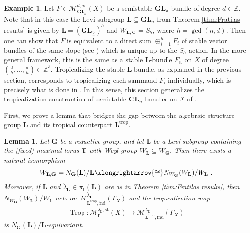 \documentclass[10pt, a4paper]{amsart}
\newtheorem{lemma}[theorem]{Lemma}
\theoremstyle{definition}
\newtheorem{example}[theorem]{Example}
\theoremstyle{myitemstyle}
\newcommand{\Z}{\mathbb{Z}}
\newcommand{\lambdacheck}{\check{\lambda}}
\newcommand{\bfG}{\mathbf{G}}
\newcommand{\bfL}{\mathbf{L}}
\newcommand{\bGL}{\mathbf{GL}}
\newcommand{\mc}[1]{{\mathcal{#1}}}
\DeclareMathOperator{\Trop}{Trop}
\newcommand{\st}{\mathrm{st}}
\newcommand{\semist}{\mathrm{ss}}
\newcommand{\ind}{\mathrm{ind}}
\newcommand{\trop}{{\mathrm{trop}}}
\begin{document}
\begin{example}
   Let $F \in \mc M^{d,\semist}_{\bGL_n}(X)$ be a semistable $\bGL_n$-bundle of degree $d \in \Z$. Note that in this case the Levi subgroup $\bfL \subseteq \bGL_n$ from Theorem \ref{thm:Fratilas results} is given by $\bfL = (\bGL_{\frac{n}{h}})^h$ and $W_{\mathbf{L},\mathbf{G}} = S_h$, where $h =\gcd(n,d)$. Then one can show that $F$ is equivalent to a direct sum $\oplus^h_{i=1} F_i$ of stable vector bundles of the same slope  (see \cite[\S 7]{2022GrossUlirschZakharov}) which is unique up to the $S_h$-action. In the more general framework, this is the same as a stable $\bfL$-bundle $F_\bfL$ on $X$ of degree $(\frac{d}{h},\ldots,\frac{d}{h})\in \Z^h$. Tropicalizing the stable $\bfL$-bundle, as explained in the previous section, corresponds to tropicalizing each summand $F_i$ individually, which is precisely what is done in \cite{2022GrossUlirschZakharov}. In this sense, this section generalizes the tropicalization construction of semistable $\bGL_n$-bundles on $X$ of \cite{2022GrossUlirschZakharov}.
\end{example}


First, we prove a lemma that bridges the gap between the algebraic structure group $\mathbf{L}$ and its tropical counterpart $\mathbf{L}^{\trop}$. 

\begin{lemma}
\label{lem:tropicalization of stable bundles is equivariant}
Let $\mathbf{G}$ be a reductive group, and let $\mathbf{L}$ be a Levi subgroup containing the (fixed) maximal torus $\mathbf{T}$ with Weyl group $W_\mathbf{L}\subseteq W_\mathbf{G}$. Then there exists a natural isomorphism 
\[
    W_{\mathbf{L},\mathbf{G}}=N_\mathbf{G}(\mathbf{L})/\mathbf{L}\xlongrightarrow{\cong} N_{W_\mathbf{G}}(W_\mathbf{L})/W_\mathbf{L} \ .
\]
Moreover, if $\bfL$ and $\lambdacheck_\bfL\in \pi_1(\bfL)$ are as in Theorem \ref{thm:Fratilas results}, then $N_{W_\bfG}(W_\bfL)/W_\bfL$ acts on $\mc M_{\bfL^\trop,\ind}^{ \lambdacheck_\bfL}(\Gamma_X)$ and the tropicalization map
\[
    \Trop\colon \mc M_{\bfL}^{\lambdacheck_\bfL,\st}(X) \longrightarrow \mc M_{\bfL^\trop,\ind}^{\lambdacheck_\bfL}(\Gamma_X)
\]
is $N_\bfG(\bfL)/\bfL$-equivariant.
\end{lemma}
\end{document}

